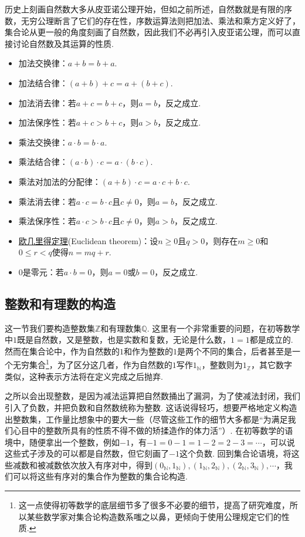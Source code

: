 历史上刻画自然数大多从皮亚诺公理开始，但如之前所述，自然数就是有限的序数，无穷公理断言了它们的存在性，序数运算法则把加法、乘法和乘方定义好了，集合论从更一般的角度刻画了自然数，因此我们不必再引入皮亚诺公理，而可以直接讨论自然数及其运算的性质.

\begin{itemize}
    \item [(1)] 加法交换律：\(a+b = b+a\).
    \item [(2)] 加法结合律：\((a+b)+c = a+(b+c)\).
    \item [(3)] 加法消去律：若\(a+c = b+c\)，则\(a=b\)，反之成立.
    \item [(4)] 加法保序性：若\(a+c>b+c\)，则\(a>b\)，反之成立.
    \item [(5)] 乘法交换律：\(a \cdot b = b \cdot a\).
    \item [(6)] 乘法结合律：\((a \cdot b) \cdot c = a \cdot (b \cdot c)\).
    \item [(7)] 乘法对加法的分配律：\((a+b) \cdot c = a \cdot c + b \cdot c\).
    \item [(8)] 乘法消去律：若\(a \cdot c = b \cdot c\)且\(c \neq 0\)，则\(a=b\)，反之成立.
    \item [(9)] 乘法保序性：若\(a \cdot c > b \cdot c\)且\(c \neq 0\)，则\(a>b\)，反之成立.
    \item [(10)] \underline{欧几里得定理}(Euclidean theorem)：设\(n\geq 0\)且\(q >0\)，则存在\(m \geq 0\)和\(0 \leq r < q\)使得\(n = mq+r\).
    \item [(11)] 0是零元：若\(a \cdot b = 0\)，则\(a=0\)或\(b=0\)，反之成立.
\end{itemize}

\subsection{整数和有理数的构造}

这一节我们要构造整数集\(\mathbb{Z}\)和有理数集\(\mathbb{Q}\). 这里有一个非常重要的问题，在初等数学中\(1\)既是自然数，又是整数，也是实数和复数，无论是什么数，\(1=1\)都是成立的. 然而在集合论中，作为自然数的\(1\)和作为整数的\(1\)是两个不同的集合，后者甚至是一个无穷集合\footnote{这一点使得初等数学的底层细节多了很多不必要的细节，提高了研究难度，所以某些数学家对集合论构造数系嗤之以鼻，更倾向于使用公理规定它们的性质.}，为了区分这几者，作为自然数的\(1\)写作\(1_{\mathbb{N}}\)，整数则为\(1_{\mathbb{Z}}\)，其它数字类似，这种表示方法将在定义完成之后抛弃.

之所以会出现整数，是因为减法运算把自然数捅出了漏洞，为了使减法封闭，我们引入了负数，并把负数和自然数统称为整数. 这话说得轻巧，想要严格地定义构造出整数集，工作量比想象中的要大一些（尽管这些工作的细节大多都是“为满足我们心目中的整数所具有的性质不得不做的矫揉造作的体力活”）.
在初等数学的语境中，随便拿出一个整数，例如\(-1\)，有\(-1 = 0-1 = 1-2 = 2-3 = \cdots\)，可以说这些式子涉及的可以都是自然数，但它刻画了\(-1\)这个负数. 回到集合论语境，将这些减数和被减数依次放入有序对中，得到\((0_{\mathbb{N}},1_{\mathbb{N}}),(1_{\mathbb{N}},2_{\mathbb{N}}),(2_{\mathbb{N}},3_{\mathbb{N}}),\cdots\)，我们可以将这些有序对的集合作为整数的集合论构造. 

